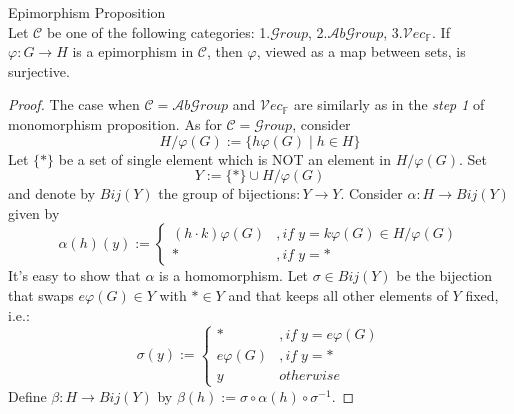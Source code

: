\begin{proposition}{Epimorphism Proposition}\\
Let $\mathcal{C}$ be one of the following categories: 1.$\mathcal{G}roup$, 2.$\mathcal{A}b\mathcal{G}roup$, 3.$\mathcal{V}ec_\mathbb{F}$. If $\varphi: G\to H$ is a epimorphism in $\mathcal{C}$, then $\varphi$, viewed as a map between sets, is surjective.
\end{proposition}

\begin{proof}
    The case when $\mathcal{C} = \mathcal{A}b\mathcal{G}roup$ and $\mathcal{V}ec_\mathbb{F}$ are similarly as in the \textit{step 1} of monomorphism proposition. As for $\mathcal{C} = \mathcal{G}roup$, consider
    $$H/ \varphi(G) := \{ h \varphi (G) \mid h \in H \}$$
    Let $\{ * \}$ be a set of single element which is NOT an element in $H / \varphi(G)$. Set
    $$Y:= \{ *\} \cup H/\varphi(G)$$
    and denote by $Bij(Y)$ the group of bijections$: Y \to Y$. Consider $\alpha: H \to Bij(Y)$ given by
    $$\alpha(h) (y) := \begin{cases}
        (h \cdot k) \varphi (G) &, if \; y = k \varphi (G) \in H / \varphi (G)\\
        * &,if\; y=*
    \end{cases}$$
    It's easy to show that $\alpha$ is a homomorphism. Let $\sigma \in Bij(Y)$ be the bijection that swaps $e\varphi (G) \in Y$ with $* \in Y$ and that keeps all other elements of $Y$ fixed, i.e.:
    $$\sigma(y):= \begin{cases}
        * &,if\;y=e\varphi(G)\\
        e\varphi(G) &,if\; y=*\\
        y &otherwise
    \end{cases}$$
    Define $\beta: H \to Bij(Y)$ by $\beta (h) := \sigma \circ \alpha(h) \circ \sigma^{-1}$.


\end{proof}
